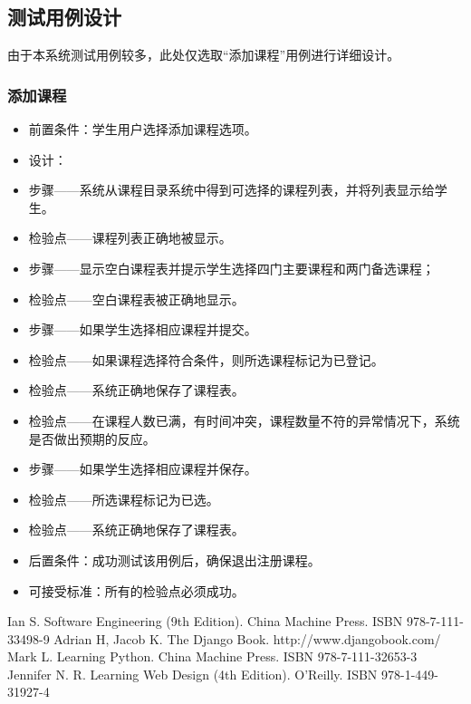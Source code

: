 \subsection{测试用例设计}

由于本系统测试用例较多，此处仅选取“添加课程”用例进行详细设计。

\subsubsection{添加课程}
  \begin{itemize}
    \item 前置条件：学生用户选择添加课程选项。
    \item 设计：
    \item 步骤——系统从课程目录系统中得到可选择的课程列表，并将列表显示给学生。
    \item 检验点——课程列表正确地被显示。
    \item 步骤——显示空白课程表并提示学生选择四门主要课程和两门备选课程；
    \item 检验点——空白课程表被正确地显示。
    \item 步骤——如果学生选择相应课程并提交。
    \item 检验点——如果课程选择符合条件，则所选课程标记为已登记。
    \item 检验点——系统正确地保存了课程表。
    \item 检验点——在课程人数已满，有时间冲突，课程数量不符的异常情况下，系统是否做出预期的反应。
    \item 步骤——如果学生选择相应课程并保存。
    \item 检验点——所选课程标记为已选。
    \item 检验点——系统正确地保存了课程表。
    \item 后置条件：成功测试该用例后，确保退出注册课程。
    \item 可接受标准：所有的检验点必须成功。
  \end{itemize}
  
\begin{thebibliography}{}
  \bibitem{} Ian S. Software Engineering (9th Edition). China Machine Press. ISBN 978-7-111-33498-9
  \bibitem{} Adrian H, Jacob K. The Django Book. http://www.djangobook.com/
  \bibitem{} Mark L. Learning Python. China Machine Press. ISBN 978-7-111-32653-3
  \bibitem{} Jennifer N. R. Learning Web Design (4th Edition). O'Reilly. ISBN 978-1-449-31927-4
\end{thebibliography}
